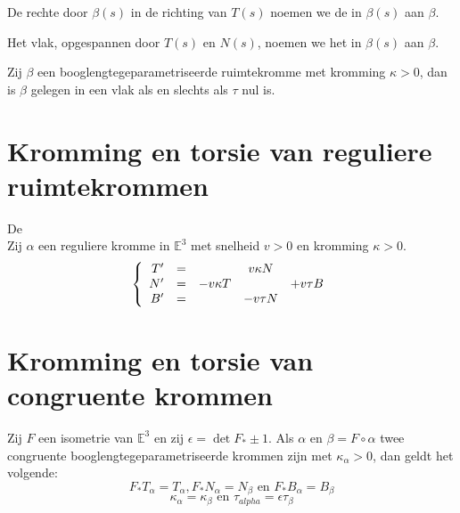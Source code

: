 \documentclass[main.tex]{subfiles}
\begin{document}
\begin{de}
  De rechte door $\beta(s)$ in de richting van $T(s)$ noemen we de  in $\beta(s)$ aan $\beta$.
\end{de}

\begin{de}
  Het vlak, opgespannen door $T(s)$ en $N(s)$, noemen we het  in $\beta(s)$ aan $\beta$.
\end{de}

\begin{st}
  Zij $\beta$ een booglengtegeparametriseerde ruimtekromme met kromming $\kappa> 0$, dan is $\beta$ gelegen in een vlak als en slechts als $\tau$ nul is.
\end{st}

\section{Kromming en torsie van reguliere ruimtekrommen}
\label{sec:kromming-en-torsie}

\begin{st}
  De \\
  Zij $\alpha$ een reguliere kromme in $\mathbb{E}^{3}$ met snelheid $v>0$ en kromming $\kappa > 0$.
  \[
  \left\{
    \begin{array}{r cccc}
      T' &=& & v\kappa N &\\
      N' &=& -v\kappa T & & +v\tau B\\
      B' &=& & -v\tau N &\\
    \end{array}
  \right.
  \]
\end{st}

\section{Kromming en torsie van congruente krommen}
\label{sec:kromming-en-torsie-1}

\begin{st}
  Zij $F$ een isometrie van $\mathbb{E}^{3}$ en zij $\epsilon = \det F_{*} \pm 1$.
  Als $\alpha$ en $\beta = F \circ \alpha$ twee congruente booglengtegeparametriseerde krommen zijn met $\kappa_{\alpha} > 0$, dan geldt het volgende:
  \[ F_{*}T_{\alpha} = T_{\alpha}, F_{*}N_{\alpha} = N_{\beta} \text{ en } F_{*}B_{\alpha}= B_{\beta} \]
  \[ \kappa_{\alpha} = \kappa_{\beta} \text{ en } \tau_{alpha} = \epsilon \tau_{\beta} \]
\end{st}
\end{document}
